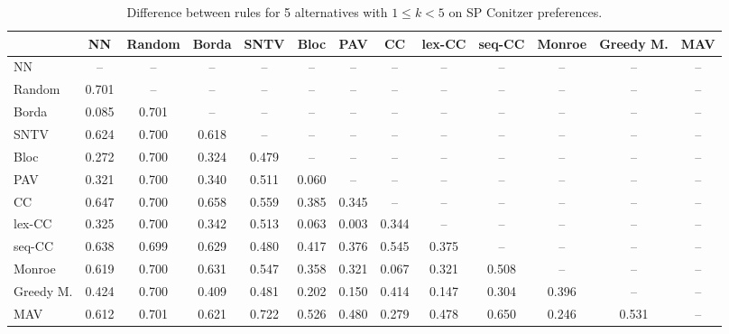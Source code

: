 
\begin{table*}[h!]
\centering
\begin{tabular}{lcccccccccccc}
\toprule
 & NN & Random & Borda & SNTV & Bloc & PAV & CC & lex-CC & seq-CC & Monroe & Greedy M. & MAV \\
\midrule
NN & -- & -- & -- & -- & -- & -- & -- & -- & -- & -- & -- & -- \\
Random & 0.701 & -- & -- & -- & -- & -- & -- & -- & -- & -- & -- & -- \\
Borda & 0.085 & 0.701 & -- & -- & -- & -- & -- & -- & -- & -- & -- & -- \\
SNTV & 0.624 & 0.700 & 0.618 & -- & -- & -- & -- & -- & -- & -- & -- & -- \\
Bloc & 0.272 & 0.700 & 0.324 & 0.479 & -- & -- & -- & -- & -- & -- & -- & -- \\
PAV & 0.321 & 0.700 & 0.340 & 0.511 & 0.060 & -- & -- & -- & -- & -- & -- & -- \\
CC & 0.647 & 0.700 & 0.658 & 0.559 & 0.385 & 0.345 & -- & -- & -- & -- & -- & -- \\
lex-CC & 0.325 & 0.700 & 0.342 & 0.513 & 0.063 & 0.003 & 0.344 & -- & -- & -- & -- & -- \\
seq-CC & 0.638 & 0.699 & 0.629 & 0.480 & 0.417 & 0.376 & 0.545 & 0.375 & -- & -- & -- & -- \\
Monroe & 0.619 & 0.700 & 0.631 & 0.547 & 0.358 & 0.321 & 0.067 & 0.321 & 0.508 & -- & -- & -- \\
Greedy M. & 0.424 & 0.700 & 0.409 & 0.481 & 0.202 & 0.150 & 0.414 & 0.147 & 0.304 & 0.396 & -- & -- \\
MAV & 0.612 & 0.701 & 0.621 & 0.722 & 0.526 & 0.480 & 0.279 & 0.478 & 0.650 & 0.246 & 0.531 & -- \\
\bottomrule
\end{tabular}

\caption{Difference between rules for 5 alternatives with $1 \leq k < 5$ on SP Conitzer preferences.}
\end{table*}
